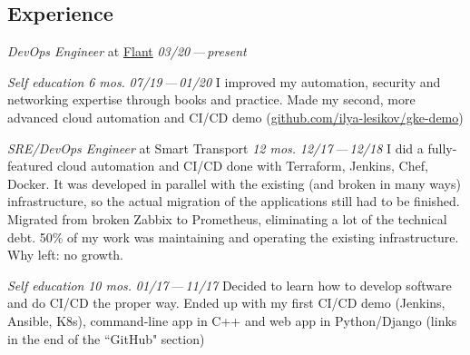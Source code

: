\documentclass[11pt, a4paper]{article}
\newcommand{\Delimitline}{
  \vspace{-2ex}
  \noindent\makebox[\linewidth]{\rule{\DelimitlineLength}{0.12ex}} }
\newcommand{\forceindent}{\leavevmode{\parindent=1em\indent}}
\begin{document}
\subsection*{\vphantom{Professional Work }Experience}
\Delimitline

\begin{etaremune}[
  topsep=1ex,itemsep=1.5ex,partopsep=0ex,
  parsep=0ex,rightmargin=1em,leftmargin=2em
]
  \item
    \emph{DevOps Engineer}\hfill
    at \href{https://github.com/flant}{Flant}\hspace{5em}
    \textit{03/20\,—\,present}\vspace{-1.5ex}\newline

  \item
    \emph{Self education}\hfill
    \textit{6 mos.}\hspace{1.0em}
    \textit{07/19\,—\,01/20}\vspace{1.5ex}\newline
    \forceindent I improved my automation, security and networking expertise through books and practice. Made my second, more advanced cloud automation and CI/CD demo (\href{https://github.com/ilya-lesikov/gke-demo}{github.com/ilya-lesikov/gke-demo})

  \item
    \emph{SRE/DevOps Engineer}\hfill
    at Smart Transport\hspace{1.0em}
    \textit{12 mos.}\hspace{1.0em}
    \textit{12/17\,—\,12/18}\vspace{1.5ex}\newline
    \forceindent I did a fully-featured cloud automation and CI/CD done with Terraform, Jenkins, Chef, Docker. It was developed in parallel with the existing (and broken in many ways) infrastructure, so the actual migration of the applications still had to be finished. Migrated from broken Zabbix to Prometheus, eliminating a lot of the technical debt. 50\% of my work was maintaining and operating the existing infrastructure.\\[0.7ex]
    \forceindent Why left: no growth.

\newpage

  \item
    \emph{Self education}\hfill
    \textit{10 mos.}\hspace{1.0em}
    \textit{01/17\,—\,11/17}\vspace{1.5ex}\newline
    \forceindent Decided to learn how to develop software and do CI/CD the proper way. Ended up with my first CI/CD demo (Jenkins, Ansible, K8s), command-line app in C++ and web app in Python/Django (links in the end of the ``GitHub" section)


\end{etaremune}
\end{document}
